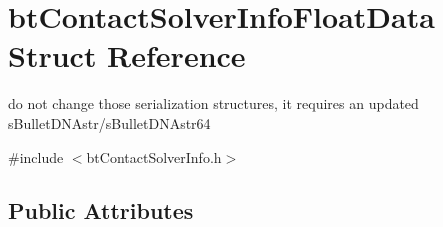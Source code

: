 \hypertarget{structbtContactSolverInfoFloatData}{}\section{bt\+Contact\+Solver\+Info\+Float\+Data Struct Reference}
\label{structbtContactSolverInfoFloatData}


do not change those serialization structures, it requires an updated s\+Bullet\+D\+N\+Astr/s\+Bullet\+D\+N\+Astr64  




{\ttfamily \#include $<$bt\+Contact\+Solver\+Info.\+h$>$}

\subsection*{Public Attributes}
